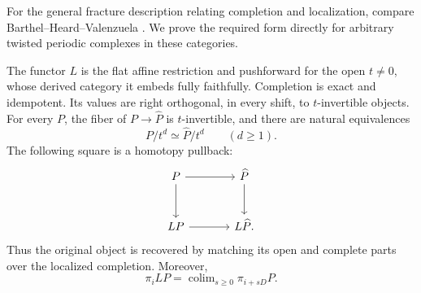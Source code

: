 For the general fracture description relating completion and
localization, compare Barthel--Heard--Valenzuela
\cite[Corollaries~2.26 and~2.28]{BHV2018}. We prove the required form
directly for arbitrary twisted periodic complexes in these categories.

\begin{proposition}[Fracture]
\label{complete:fracture}
The functor $L$ is the flat affine restriction and pushforward for the
open $t\ne 0$, whose derived category it embeds fully faithfully.
Completion is exact and idempotent. Its values are right orthogonal,
in every shift, to $t$-invertible objects. For every $P$, the fiber of
$P\to\widehat P$ is $t$-invertible, and there are natural equivalences
\[
 P/t^d\simeq\widehat P/t^d \qquad(d\geq 1).
\]
The following square is a homotopy pullback:
\begin{equation}
\label{complete:fracture-square}
\begin{tikzcd}[column sep=large,row sep=large]
 P \arrow[r] \arrow[d] & \widehat P \arrow[d]\\
 LP \arrow[r] & L\widehat P.
\end{tikzcd}
\end{equation}
Thus the original object is recovered by matching its open and complete
parts over the localized completion. Moreover,
\begin{equation}
\label{complete:localization-sections}
 \pi_i LP=\mathop{\mathrm{colim}}_{s\geq 0}\pi_{i+sD}P.
\end{equation}
\end{proposition}

